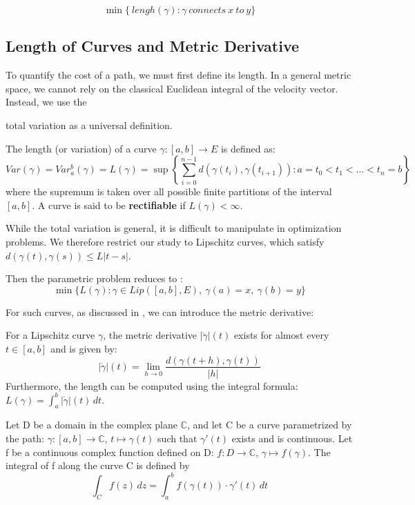 \documentclass[12pt]{article}
\begin{document}
$$
    \min \{\ lengh(\gamma) : \gamma \ connects \ x \ to \ y \}
$$

\subsection{Length of Curves and Metric Derivative}

To quantify the cost of a path, we must first define its length. In a general metric space, we cannot rely on the classical Euclidean integral of the velocity vector. Instead, we use the {total variation as a universal definition.

\begin{definition}
The length (or variation) of a curve $\gamma: [a, b] \to E$ is defined as:
\begin{equation}
    Var(\gamma)=Var_a^b(\gamma)=L(\gamma) = \sup \left\{ \sum_{i=0}^{n-1} d(\gamma(t_i), \gamma(t_{i+1})) : a = t_0 < t_1 < \dots < t_n = b \right\}
\end{equation}
where the supremum is taken over all possible finite partitions of the interval $[a, b]$. A curve is said to be \textbf{rectifiable} if $L(\gamma) < \infty$.
\end{definition}

While the total variation is general, it is difficult to manipulate in optimization problems. We therefore restrict our study to Lipschitz curves, which satisfy $d(\gamma(t), \gamma(s)) \leq L |t-s|$. 

Then the parametric problem reduces to :
\begin{equation}
    \min \{ L(\gamma) : \gamma \in Lip([a,b],E), \ \gamma(a)=x, \ \gamma(b)=y \}
\end{equation}

For such curves, as discussed in \cite{ambrosio2004topics}, we can introduce the metric derivative:

\begin{definition}
For a Lipschitz curve $\gamma$, the metric derivative $|\dot{\gamma}|(t)$ exists for almost every $t \in [a, b]$ and is given by:
$$
    |\dot{\gamma}|(t) = \lim_{h \to 0} \frac{d(\gamma(t+h), \gamma(t))}{|h|}
$$
Furthermore, the length can be computed using the integral formula: $L(\gamma) = \int_a^b |\dot{\gamma}|(t) \, dt$.
\end{definition}

\begin{definition} \cite{UE_analyse_complexe}
    Let D be a domain in the complex plane $\mathbb{C}$, and let C be a curve parametrized by the path: $\gamma : [a,b] \to \mathbb{C}$, $t \mapsto \gamma(t)$ such that $\gamma'(t)$ exists and is continuous. Let f be a continuous complex function defined on D: $f : D \to \mathbb{C}$, $\gamma \mapsto f(\gamma)$. The integral of f along the curve C is defined by
    $$
    \int_C f(z)\, dz = \int_a^b f(\gamma(t)) \cdot \gamma'(t)\, dt  
    $$
\end{definition}


}
\end{document}
